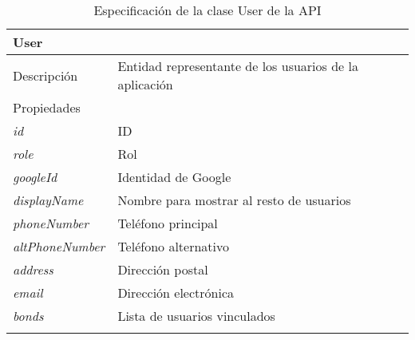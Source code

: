 \begin{longtable}{|p{} p{}|}
    \hline
    \multicolumn{2}{|l|}{User} \\ \hline \hline
    Descripción      & Entidad representante de los usuarios de la aplicación \\ \hline
    \multicolumn{2}{|l|}{Propiedades} \\
    \emph{id}  & ID  \\
    \emph{role}  & Rol  \\
    \emph{googleId}  & Identidad de Google  \\
    \emph{displayName}  & Nombre para mostrar al resto de usuarios  \\
    \emph{phoneNumber}  & Teléfono principal  \\
    \emph{altPhoneNumber}  & Teléfono alternativo  \\
    \emph{address}  & Dirección postal  \\
    \emph{email}  & Dirección electrónica  \\
    \emph{bonds}  & Lista de usuarios vinculados  \\ \hline
    \caption{Especificación de la clase User de la API}
    \label{class:api:user}
\end{longtable}
